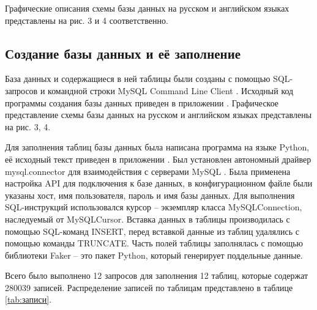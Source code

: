 \documentclass[a4paper]{article}
\begin{document}
Графические описания схемы базы данных на русском и английском языках представлены на рис. 3 и 4 соответственно.





\setcounter{subsection}{4}
\subsection{Создание базы данных и её заполнение}
База данных и содержащиеся в ней таблицы были созданы с помощью SQL-запросов и командной строки MySQL Command Line Client \cite{dbintro}. Исходный код программы создания базы данных приведен в приложении . Графическое представление схемы базы данных на русском и английском языках представлены на рис. 3, 4.

Для заполнения таблиц базы данных была написана программа на языке Python, её исходный текст приведен в приложении . Был установлен автономный драйвер mysql.connector для взаимодействия с серверами MySQL \cite{pymysql}. Была применена настройка API для подключения к базе данных, в конфигурационном файле были указаны хост, имя пользователя, пароль и имя базы данных. Для выполнения SQL-инструкций использовался курсор -- экземпляр класса MySQLConnection, наследуемый от MySQLCursor. Вставка данных в таблицы производилась с помощью SQL-команд INSERT, перед вставкой данные из таблиц удалялись с помощью команды TRUNCATE. Часть полей таблицы заполнялась с помощью библиотеки Faker -- это пакет Python, который генерирует поддельные данные. 

Всего было выполнено 12 запросов для заполнения 12 таблиц, которые содержат 280039 записей. Распределение записей по таблицам представлено в таблице \ref{tab:записи}.
\end{document}
